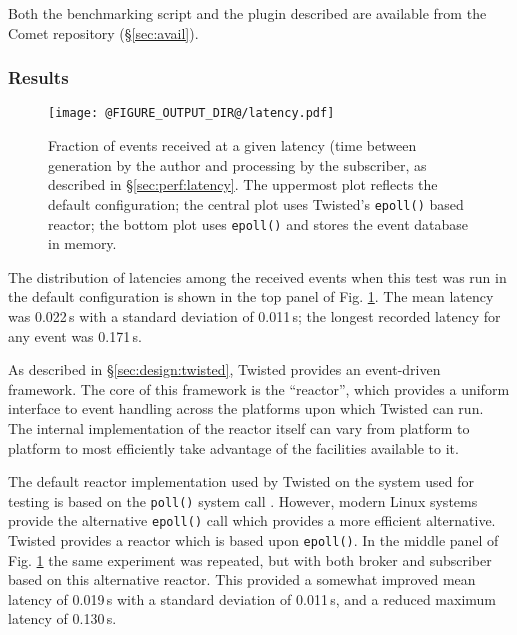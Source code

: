 \documentclass[5p,authoryear]{elsarticle}
\begin{document}
Both the benchmarking script and the plugin described are available from the
Comet repository (\S\ref{sec:avail}).

\subsubsection{Results}
\label{sec:perf:latency:results}

\begin{figure}
  \begin{center}
  \texttt{[image: @FIGURE\_OUTPUT\_DIR@/latency.pdf]}
  \end{center}

  \caption{Fraction of events received at a given latency (time between
  generation by the author and processing by the subscriber, as described in
  \S\ref{sec:perf:latency}. The uppermost plot reflects the default
  configuration; the central plot uses Twisted's \texttt{epoll()} based
  reactor; the bottom plot uses \texttt{epoll()} and stores the event database
  in memory.}

  \label{fig:latency}
\end{figure}

The distribution of latencies among the received events when this test was run
in the default configuration is shown in the top panel of Fig.
\ref{fig:latency}. The mean latency was 0.022\,s with a standard deviation of
0.011\,s; the longest recorded latency for any event was 0.171\,s.

As described in \S\ref{sec:design:twisted}, Twisted provides an event-driven
framework. The core of this framework is the ``reactor'', which provides a
uniform interface to event handling across the platforms upon which Twisted
can run. The internal implementation of the reactor itself can vary from
platform to platform to most efficiently take advantage of the facilities
available to it.

The default reactor implementation used by Twisted on the system used for
testing is based on the \texttt{poll()} system call \citep{Posix1:2013}.
However, modern Linux systems provide the alternative \texttt{epoll()} call
\citep{Kerrisk:2014} which provides a more efficient alternative. Twisted
provides a reactor which is based upon \texttt{epoll()}. In the middle panel of
Fig. \ref{fig:latency} the same experiment was repeated, but with both broker
and subscriber based on this alternative reactor. This provided a somewhat
improved mean latency of 0.019\,s with a standard deviation of 0.011\,s, and a
reduced maximum latency of 0.130\,s.
\end{document}
